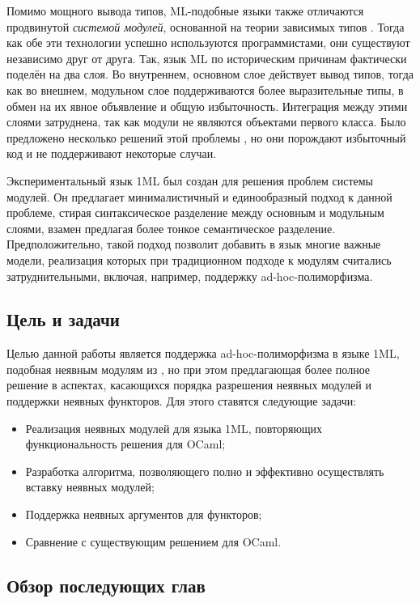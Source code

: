 \documentclass[../diploma.tex]{subfiles}
\begin{document}
Помимо мощного вывода типов, ML-подобные языки также отличаются продвинутой \textit{системой модулей}, основанной на теории зависимых типов \cite{dependent_types}. Тогда как обе эти технологии успешно используются программистами, они существуют независимо друг от друга. Так, язык ML по историческим причинам фактически поделён на два слоя. Во внутреннем, основном слое действует вывод типов, тогда как во внешнем, модульном слое поддерживаются более выразительные типы, в обмен на их явное объявление и общую избыточность. Интеграция между этими слоями затруднена, так как модули не являются объектами первого класса. Было предложено несколько решений этой проблемы \cite{packaged} \cite{aliceml} \cite{packaged_ocaml}, но они порождают избыточный код и не поддерживают некоторые случаи.

Экспериментальный язык 1ML \cite{1ml} был создан для решения проблем системы модулей. Он предлагает минималистичный и единообразный подход к данной проблеме, стирая синтаксическое разделение между основным и модульным слоями, взамен предлагая более тонкое семантическое разделение. Предположительно, такой подход позволит добавить в язык многие важные модели, реализация которых при традиционном подходе к модулям считались затруднительными, включая, например, поддержку ad-hoc-полиморфизма.

\subsection*{Цель и задачи}

Целью данной работы является поддержка ad-hoc-полиморфизма в языке 1ML, подобная неявным модулям из \cite{white}, но при этом предлагающая более полное решение в аспектах, касающихся порядка разрешения неявных модулей и поддержки неявных функторов. Для этого ставятся следующие задачи:

\begin{itemize}
	\item Реализация неявных модулей для языка 1ML, повторяющих функциональность решения для OCaml;
	\item Разработка алгоритма, позволяющего полно и эффективно осуществлять вставку неявных модулей;
	\item Поддержка неявных аргументов для функторов;
	\item Сравнение с существующим решением \cite{white} для OCaml.
\end{itemize}

\subsection*{Обзор последующих глав}
\end{document}
